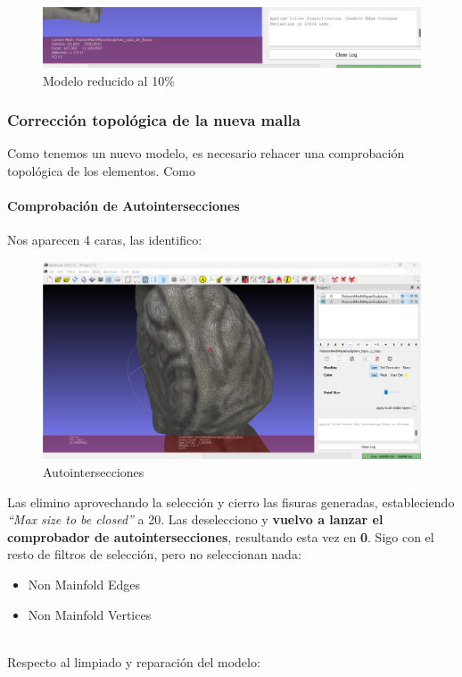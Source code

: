 \documentclass[options]{article}
\begin{document}
\begin{figure}[H]
    \centering
    \includegraphics[scale=0.55]{images/simplificacion_02.png}
    \caption{Modelo reducido al 10\%}
\end{figure}

\subsubsection{Corrección topológica de la nueva malla}

Como tenemos un nuevo modelo, es necesario rehacer una comprobación topológica de los elementos. Como   

\paragraph{Comprobación de Autointersecciones}

Nos aparecen 4 caras, las identifico:

\begin{figure}[H]
    \centering
    \includegraphics[scale=0.35]{images/simplificacion_03.png}
    \caption{Autointersecciones}
\end{figure}

Las elimino aprovechando la selección y cierro las fisuras generadas, estableciendo \textit{``Max size to be closed''} a 20. Las deselecciono y \textbf{vuelvo a lanzar el comprobador de autointersecciones}, resultando esta vez en \textbf{0}. Sigo con el resto de filtros de selección, pero no seleccionan nada:

\begin{itemize}
    \item Non Mainfold Edges
    \item Non Mainfold Vertices
\end{itemize}
~\\
Respecto al limpiado y reparación del modelo:
\end{document}
